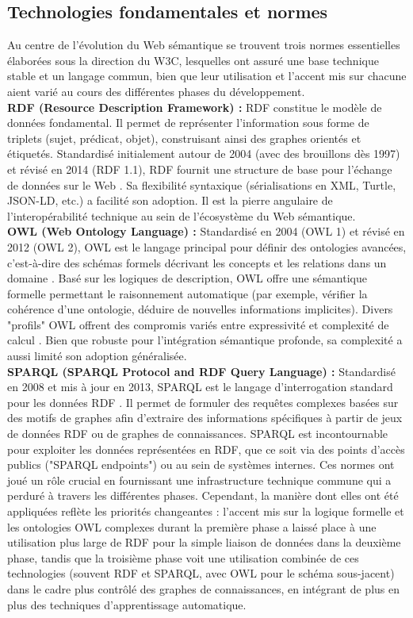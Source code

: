 \documentclass[9pt,twocolumn,twoside,french]{opticajnl}
\begin{document}
\subsection{Technologies fondamentales et normes}
Au centre de l’évolution du Web sémantique se trouvent trois normes essentielles élaborées sous la direction du W3C, lesquelles ont assuré une base technique stable et un langage commun, bien que leur utilisation et l’accent mis sur chacune aient varié au cours des différentes phases du développement. \\
\textbf{RDF (Resource Description Framework) :} RDF constitue le modèle de données fondamental. Il permet de représenter l’information sous forme de triplets (sujet, prédicat, objet), construisant ainsi des graphes orientés et étiquetés. Standardisé initialement autour de 2004 (avec des brouillons dès 1997) et révisé en 2014 (RDF 1.1), RDF fournit une structure de base pour l’échange de données sur le Web \citep{Hitzler2021}. Sa flexibilité syntaxique (sérialisations en XML, Turtle, JSON-LD, etc.) a facilité son adoption. Il est la pierre angulaire de l’interopérabilité technique au sein de l’écosystème du Web sémantique. \\
\textbf{OWL (Web Ontology Language) :} Standardisé en 2004 (OWL 1) et révisé en 2012 (OWL 2), OWL est le langage principal pour définir des ontologies avancées, c'est-à-dire des schémas formels décrivant les concepts et les relations dans un domaine \citep{Hitzler2021}. Basé sur les logiques de description, OWL offre une sémantique formelle permettant le raisonnement automatique (par exemple, vérifier la cohérence d’une ontologie, déduire de nouvelles informations implicites). Divers "profils" OWL offrent des compromis variés entre expressivité et complexité de calcul \citep{Hitzler2010Foundations}. Bien que robuste pour l’intégration sémantique profonde, sa complexité a aussi limité son adoption généralisée. \\
\textbf{SPARQL (SPARQL Protocol and RDF Query Language) :} Standardisé en 2008 et mis à jour en 2013, SPARQL est le langage d’interrogation standard pour les données RDF \citep{Hitzler2021}. Il permet de formuler des requêtes complexes basées sur des motifs de graphes afin d’extraire des informations spécifiques à partir de jeux de données RDF ou de graphes de connaissances. SPARQL est incontournable pour exploiter les données représentées en RDF, que ce soit via des points d’accès publics ("SPARQL endpoints") ou au sein de systèmes internes.
Ces normes ont joué un rôle crucial en fournissant une infrastructure technique commune qui a perduré à travers les différentes phases. Cependant, la manière dont elles ont été appliquées reflète les priorités changeantes : l'accent mis sur la logique formelle et les ontologies OWL complexes durant la première phase a laissé place à une utilisation plus large de RDF pour la simple liaison de données dans la deuxième phase, tandis que la troisième phase voit une utilisation combinée de ces technologies (souvent RDF et SPARQL, avec OWL pour le schéma sous-jacent) dans le cadre plus contrôlé des graphes de connaissances, en intégrant de plus en plus des techniques d’apprentissage automatique.
\end{document}
